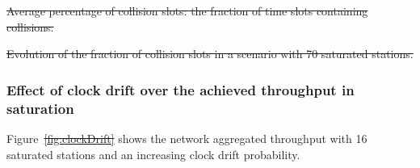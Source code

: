 \documentclass[a4paper,journal]{IEEEtran}
\providecommand{\DIFaddtex}[1]{{\protect\color{blue}\uwave{#1}}} %
\providecommand{\DIFdeltex}[1]{{\protect\color{red}\sout{#1}}}                      %
\providecommand{\DIFaddbegin}{} %
\providecommand{\DIFaddend}{} %
\providecommand{\DIFdelbegin}{} %
\providecommand{\DIFdelend}{} %
\providecommand{\DIFdelFL}[1]{\DIFdel{#1}} %
\providecommand{\DIFadd}[1]{\texorpdfstring{\DIFaddtex{#1}}{#1}} %
\providecommand{\DIFdel}[1]{\texorpdfstring{\DIFdeltex{#1}}{}} %
\begin{document}
\DIFdelbegin %
{%
\DIFdelFL{Average percentage of collision slots: the fraction of time slots containing collisions.}}
\DIFdelend %

	\DIFdelbegin %
{%
\DIFdelFL{Evolution of the fraction of collision slots in a scenario with 70 saturated stations.}}

\DIFdelend \subsubsection{Effect of clock drift over the achieved throughput in saturation}\label{performanceClockDrift}
	Figure~\DIFdelbegin \DIFdel{\ref{fig:clockDrift} }\DIFdelend \DIFaddbegin \DIFadd{\ref{fig:satResults}e }\DIFaddend shows the network aggregated throughput with 16 saturated stations and an increasing clock drift probability.
\end{document}
